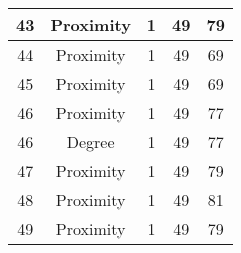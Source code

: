\documentclass[results.tex]{subfiles}
\begin{document}
\begin{center}
\begin{tabular}{| c || c | c | c | c |}
            \hline
            43                      & Proximity                    & 1                      & 49                      & 79                   \\
            \hline
            44                      & Proximity                    & 1                      & 49                      & 69                   \\
            \hline
            45                      & Proximity                    & 1                      & 49                      & 69                   \\
            \hline
            46                      & Proximity                    & 1                      & 49                      & 77                   \\
            \hline
            46                      & Degree                       & 1                      & 49                      & 77                   \\
            \hline
            47                      & Proximity                    & 1                      & 49                      & 79                   \\
            \hline
            48                      & Proximity                    & 1                      & 49                      & 81                   \\
            \hline
            49                      & Proximity                    & 1                      & 49                      & 79                   \\
            \hline
        \end{tabular}
    \end{center}
\end{document}
